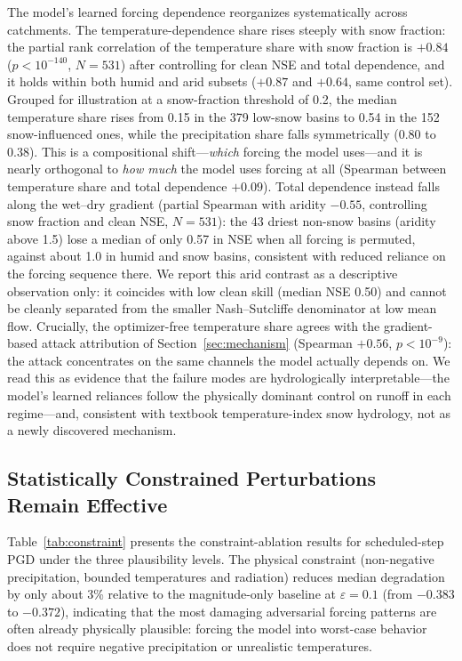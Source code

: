 \documentclass[final]{agujournal2019}
\begin{document}
The model's learned forcing dependence reorganizes systematically across catchments. The temperature-dependence share rises steeply with snow fraction: the partial rank correlation of the temperature share with snow fraction is $+0.84$ ($p < 10^{-140}$, $N = 531$) after controlling for clean NSE and total dependence, and it holds within both humid and arid subsets ($+0.87$ and $+0.64$, same control set). Grouped for illustration at a snow-fraction threshold of 0.2, the median temperature share rises from 0.15 in the 379 low-snow basins to 0.54 in the 152 snow-influenced ones, while the precipitation share falls symmetrically (0.80 to 0.38). This is a compositional shift---\emph{which} forcing the model uses---and it is nearly orthogonal to \emph{how much} the model uses forcing at all (Spearman between temperature share and total dependence $+0.09$). Total dependence instead falls along the wet--dry gradient (partial Spearman with aridity $-0.55$, controlling snow fraction and clean NSE, $N = 531$): the 43 driest non-snow basins (aridity above 1.5) lose a median of only 0.57 in NSE when all forcing is permuted, against about 1.0 in humid and snow basins, consistent with reduced reliance on the forcing sequence there. We report this arid contrast as a descriptive observation only: it coincides with low clean skill (median NSE 0.50) and cannot be cleanly separated from the smaller Nash--Sutcliffe denominator at low mean flow. Crucially, the optimizer-free temperature share agrees with the gradient-based attack attribution of Section~\ref{sec:mechanism} (Spearman $+0.56$, $p < 10^{-9}$): the attack concentrates on the same channels the model actually depends on. We read this as evidence that the failure modes are hydrologically interpretable---the model's learned reliances follow the physically dominant control on runoff in each regime---and, consistent with textbook temperature-index snow hydrology, not as a newly discovered mechanism.

\subsection{Statistically Constrained Perturbations Remain Effective}
\label{sec:constraint}

Table~\ref{tab:constraint} presents the constraint-ablation results for scheduled-step PGD under the three plausibility levels. The physical constraint (non-negative precipitation, bounded temperatures and radiation) reduces median degradation by only about 3\% relative to the magnitude-only baseline at $\varepsilon = 0.1$ (from $-0.383$ to $-0.372$), indicating that the most damaging adversarial forcing patterns are often already physically plausible: forcing the model into worst-case behavior does not require negative precipitation or unrealistic temperatures.
\end{document}
